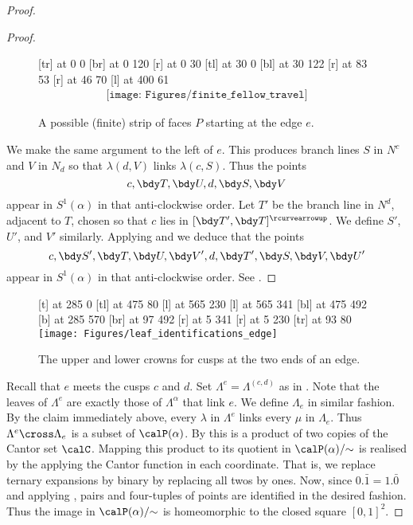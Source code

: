 \documentclass[12pt]{amsart}
\newcommand{\acw}{\rcurvearrowup}
\begin{document}
\begin{proof}
\begin{proof}
\begin{figure}[htbp]
\small\hair 2pt
 [tr] at 0 0
 [br] at 0 120
 [r] at 0 30
 [tl] at 30 0
 [bl] at 30 122
 [r] at 83 53
 [r] at 46 70
 [l] at 400 61
\endlabellist
\[
\begin{array}{c}
\texttt{[image: Figures/finite\_fellow\_travel]}
\end{array}
\]
\caption{A possible (finite) strip of faces $P$ starting at the edge $e$.}
\label{Fig:FiniteFellowTravel}
\end{figure}



We make the same argument to the left of $e$.  This produces branch lines $S$ in $N^c$ and $V$ in $N_d$ so that $\lambda(d, V)$ links $\lambda(c, S)$.  Thus the points 
\[
c, \bdy T, \bdy U, d, \bdy S, \bdy V
\]
appear in $S^1(\alpha)$ in that anti-clockwise order.  Let $T'$ be the branch line in $N^d$, adjacent to $T$, chosen so that $c$ lies in $[\bdy T', \bdy T]^\acw$.  We define $S'$, $U'$, and $V'$ similarly.  Applying  and  we deduce that the points
\[
c, \bdy S', \bdy T, \bdy U, \bdy V', d, \bdy T', \bdy S, \bdy V, \bdy U'
\]
appear in $S^1(\alpha)$ in that anti-clockwise order. See .
\end{proof}

\begin{figure}[htb]
\centering
{}
\small\hair 2pt
 [t] at 285 0
 [tl] at 475 80
 [l] at 565 230
 [l] at 565 341
 [bl] at 475 492
 [b] at 285 570
 [br] at 97 492
 [r] at 5 341
 [r] at 5 230
 [tr] at 93 80
\endlabellist
\texttt{[image: Figures/leaf\_identifications\_edge]}
\caption{The upper and lower crowns for cusps at the two ends of an edge.}
\label{Fig:LeafIdentificationsEdge}
\end{figure}

Recall that $e$ meets the cusps $c$ and $d$.  Set $\Lambda^e = \Lambda^{(c, d)}$ as in .  Note that the leaves of $\Lambda^e$ are exactly those of $\Lambda^\alpha$ that link $e$.   We define $\Lambda_e$ in similar fashion.  By the claim immediately above, every $\lambda$ in $\Lambda^e$ links every $\mu$ in $\Lambda_e$.  Thus $\Lambda^e \cross \Lambda_e$ is a subset of $\calP(\alpha)$.  By  this is a product of two copies of the Cantor set $\calC$.  Mapping this product to its quotient in $\calP(\alpha)/{\sim}$ is realised by the applying the Cantor function in each coordinate.  That is, we replace ternary expansions by binary by replacing all twos by ones.  Now, since $0.\bar{1} = 1.\bar{0}$ and applying , pairs and four-tuples of points are identified in the desired fashion.  Thus the image in $\calP(\alpha)/{\sim}$ is homeomorphic to the closed square $[0,1]^2$.  


\end{proof}
\end{document}
